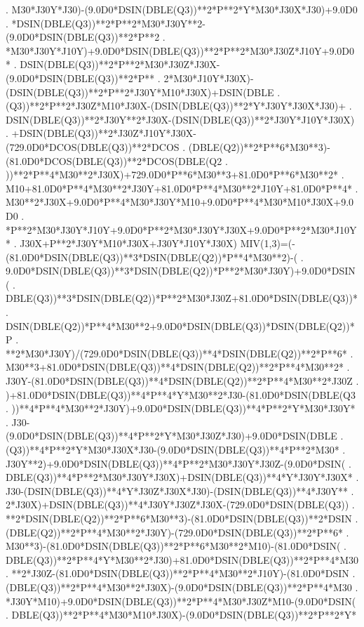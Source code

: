 \begin{framedverbatim}
     . M30*J30Y*J30)-(9.0D0*DSIN(DBLE(Q3))**2*P**2*Y*M30*J30X*J30)+9.0D0
     . *DSIN(DBLE(Q3))**2*P**2*M30*J30Y**2-(9.0D0*DSIN(DBLE(Q3))**2*P**2
     . *M30*J30Y*J10Y)+9.0D0*DSIN(DBLE(Q3))**2*P**2*M30*J30Z*J10Y+9.0D0*
     . DSIN(DBLE(Q3))**2*P**2*M30*J30Z*J30X-(9.0D0*DSIN(DBLE(Q3))**2*P**
     . 2*M30*J10Y*J30X)-(DSIN(DBLE(Q3))**2*P**2*J30Y*M10*J30X)+DSIN(DBLE
     . (Q3))**2*P**2*J30Z*M10*J30X-(DSIN(DBLE(Q3))**2*Y*J30Y*J30X*J30)+
     . DSIN(DBLE(Q3))**2*J30Y**2*J30X-(DSIN(DBLE(Q3))**2*J30Y*J10Y*J30X)
     . +DSIN(DBLE(Q3))**2*J30Z*J10Y*J30X-(729.0D0*DCOS(DBLE(Q3))**2*DCOS
     . (DBLE(Q2))**2*P**6*M30**3)-(81.0D0*DCOS(DBLE(Q3))**2*DCOS(DBLE(Q2
     . ))**2*P**4*M30**2*J30X)+729.0D0*P**6*M30**3+81.0D0*P**6*M30**2*
     . M10+81.0D0*P**4*M30**2*J30Y+81.0D0*P**4*M30**2*J10Y+81.0D0*P**4*
     . M30**2*J30X+9.0D0*P**4*M30*J30Y*M10+9.0D0*P**4*M30*M10*J30X+9.0D0
     . *P**2*M30*J30Y*J10Y+9.0D0*P**2*M30*J30Y*J30X+9.0D0*P**2*M30*J10Y*
     . J30X+P**2*J30Y*M10*J30X+J30Y*J10Y*J30X)
      MIV(1,3)=(-(81.0D0*DSIN(DBLE(Q3))**3*DSIN(DBLE(Q2))*P**4*M30**2)-(
     . 9.0D0*DSIN(DBLE(Q3))**3*DSIN(DBLE(Q2))*P**2*M30*J30Y)+9.0D0*DSIN(
     . DBLE(Q3))**3*DSIN(DBLE(Q2))*P**2*M30*J30Z+81.0D0*DSIN(DBLE(Q3))*
     . DSIN(DBLE(Q2))*P**4*M30**2+9.0D0*DSIN(DBLE(Q3))*DSIN(DBLE(Q2))*P
     . **2*M30*J30Y)/(729.0D0*DSIN(DBLE(Q3))**4*DSIN(DBLE(Q2))**2*P**6*
     . M30**3+81.0D0*DSIN(DBLE(Q3))**4*DSIN(DBLE(Q2))**2*P**4*M30**2*
     . J30Y-(81.0D0*DSIN(DBLE(Q3))**4*DSIN(DBLE(Q2))**2*P**4*M30**2*J30Z
     . )+81.0D0*DSIN(DBLE(Q3))**4*P**4*Y*M30**2*J30-(81.0D0*DSIN(DBLE(Q3
     . ))**4*P**4*M30**2*J30Y)+9.0D0*DSIN(DBLE(Q3))**4*P**2*Y*M30*J30Y*
     . J30-(9.0D0*DSIN(DBLE(Q3))**4*P**2*Y*M30*J30Z*J30)+9.0D0*DSIN(DBLE
     . (Q3))**4*P**2*Y*M30*J30X*J30-(9.0D0*DSIN(DBLE(Q3))**4*P**2*M30*
     . J30Y**2)+9.0D0*DSIN(DBLE(Q3))**4*P**2*M30*J30Y*J30Z-(9.0D0*DSIN(
     . DBLE(Q3))**4*P**2*M30*J30Y*J30X)+DSIN(DBLE(Q3))**4*Y*J30Y*J30X*
     . J30-(DSIN(DBLE(Q3))**4*Y*J30Z*J30X*J30)-(DSIN(DBLE(Q3))**4*J30Y**
     . 2*J30X)+DSIN(DBLE(Q3))**4*J30Y*J30Z*J30X-(729.0D0*DSIN(DBLE(Q3))
     . **2*DSIN(DBLE(Q2))**2*P**6*M30**3)-(81.0D0*DSIN(DBLE(Q3))**2*DSIN
     . (DBLE(Q2))**2*P**4*M30**2*J30Y)-(729.0D0*DSIN(DBLE(Q3))**2*P**6*
     . M30**3)-(81.0D0*DSIN(DBLE(Q3))**2*P**6*M30**2*M10)-(81.0D0*DSIN(
     . DBLE(Q3))**2*P**4*Y*M30**2*J30)+81.0D0*DSIN(DBLE(Q3))**2*P**4*M30
     . **2*J30Z-(81.0D0*DSIN(DBLE(Q3))**2*P**4*M30**2*J10Y)-(81.0D0*DSIN
     . (DBLE(Q3))**2*P**4*M30**2*J30X)-(9.0D0*DSIN(DBLE(Q3))**2*P**4*M30
     . *J30Y*M10)+9.0D0*DSIN(DBLE(Q3))**2*P**4*M30*J30Z*M10-(9.0D0*DSIN(
     . DBLE(Q3))**2*P**4*M30*M10*J30X)-(9.0D0*DSIN(DBLE(Q3))**2*P**2*Y*

\end{framedverbatim}
